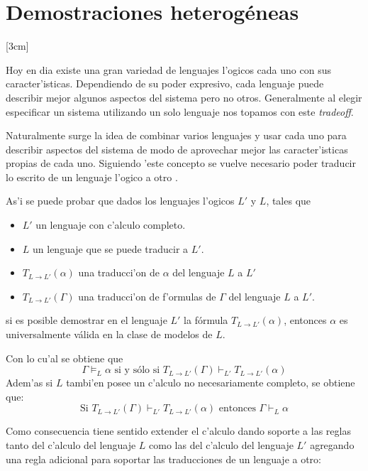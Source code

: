 \section{Demostraciones heterogéneas}
\label{heterogenious proofs}

[3cm]

Hoy en dia existe una gran variedad de lenguajes l'ogicos cada uno con sus caracter'isticas. Dependiendo de su poder expresivo, cada lenguaje puede describir mejor algunos aspectos del sistema pero no otros. Generalmente al elegir especificar un sistema utilizando un solo lenguaje nos topamos con este \textit{tradeoff}.

Naturalmente surge la idea de combinar varios lenguajes y usar cada uno para describir aspectos del sistema de modo de aprovechar mejor las caracter'isticas propias de cada uno. Siguiendo 'este concepto se vuelve necesario poder traducir lo escrito de un lenguaje l'ogico a otro \cite{goguen:jacm-39_1,meseguer:lc87,tarlecki:sadt-rtdts95}.

As'i se puede probar que dados los lenguajes l'ogicos $L'$ y $L$, tales que 

\begin{itemize}
\item $L'$ un lenguaje con c'alculo completo.
\item $L$ un lenguaje que se puede traducir a $L'$.
\item $T_{L \to L'}(\alpha)$ una traducci'on de $\alpha$ del lenguaje $L$ a $L'$ 
\item $T_{L \to L'}(\Gamma)$ una traducci'on de f'ormulas de $\Gamma$ del lenguaje $L$ a $L'$.
\end{itemize}
si es posible demostrar en el lenguaje $L'$ la fórmula $T_{L \to L'} (\alpha)$, entonces $\alpha$ es universalmente válida en la clase de modelos de $L$.

Con lo cu'al se obtiene que
$$\Gamma \models_L \alpha \mbox{ si y sólo si } T_{L \to L'}(\Gamma) \vdash_{L'} T_{L \to L'}(\alpha)$$
Adem'as si $L$ tambi'en posee un c'alculo no necesariamente completo, se obtiene que:
$$\mbox{Si } T_{L \to L'}(\Gamma) \vdash_{L'} T_{L \to L'}(\alpha) \mbox{ entonces } \Gamma \vdash_L \alpha$$

Como consecuencia tiene sentido extender el c'alculo dando soporte a las reglas tanto del c'alculo del lenguaje $L$ como las del c'alculo del lenguaje $L'$ agregando una regla adicional para soportar las traducciones de un lenguaje a otro:

